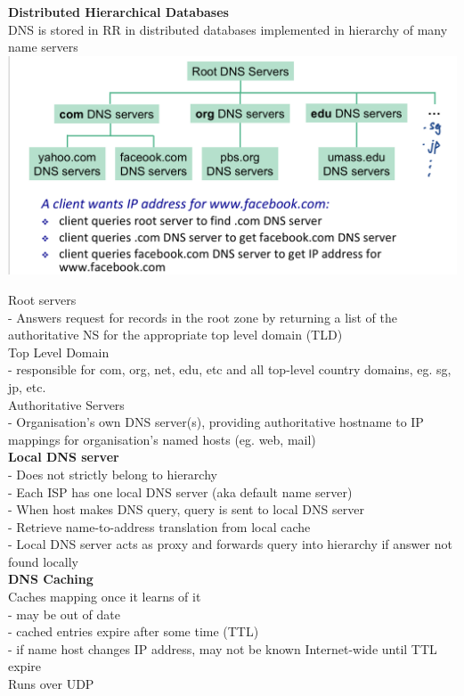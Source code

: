 \documentclass[10pt, a4paper]{article}
\newcommand{\red}[1]{{\color{red}#1}}
\begin{document}
\begin{multicols*}{3}
		\textbf{Distributed Hierarchical Databases}\\
		DNS is stored in RR in distributed databases implemented in hierarchy of many name servers\\
		\includegraphics[scale=.13]{./assets/dnsDatabases}

		Root servers\\
		- Answers request for records in the root zone by returning a list of the authoritative NS for the appropriate top level domain (TLD)\\

		Top Level Domain\\
		- responsible for com, org, net, edu, etc and all top-level country domains, eg. sg, jp, etc.\\

		Authoritative Servers\\
		- Organisation's own DNS server(s), providing authoritative hostname to IP mappings for organisation's named hosts (eg. web, mail)\\

		\textbf{Local DNS server}\\
		- Does not strictly belong to hierarchy\\
		- Each ISP has one local DNS server (aka default name server)\\
		- When host makes DNS query, query is sent to local DNS server\\
		- Retrieve name-to-address translation from local cache\\
		- Local DNS server acts as proxy and forwards query into hierarchy if answer not found locally\\

		\textbf{DNS Caching}\\
		Caches mapping once it learns of it\\
		- may be out of date\\
		- cached entries expire after some time (TTL)\\
		- if name host changes IP address, may not be known Internet-wide until TTL expire\\
		Runs over \red{UDP}\\


\end{multicols*}
\end{document}

